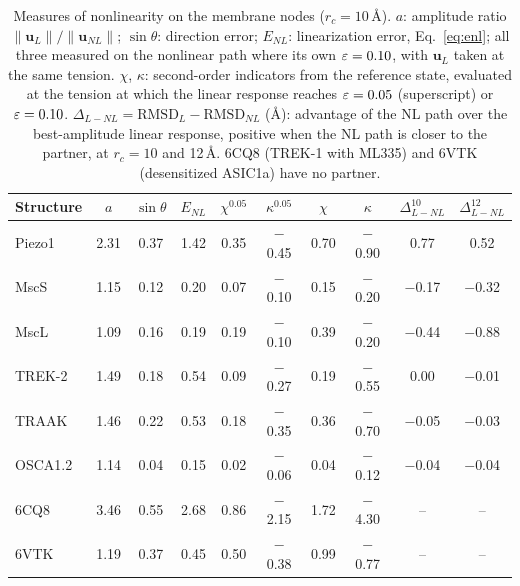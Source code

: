 \begin{table}[t]
\centering\small
\caption{Measures of nonlinearity on the membrane nodes ($r_c=10$\,\AA). $a$: amplitude ratio $\|\mathbf{u}_L\|/\|\mathbf{u}_{NL}\|$; $\sin\theta$: direction error; $E_{NL}$: linearization error, Eq.~\eqref{eq:enl}; all three measured on the nonlinear path where its own $\varepsilon=0.10$, with $\mathbf{u}_L$ taken at the same tension. $\chi$, $\kappa$: second-order indicators from the reference state, evaluated at the tension at which the linear response reaches $\varepsilon=0.05$ (superscript) or $\varepsilon=0.10$. $\Delta_{L-NL}=\mathrm{RMSD}_{L}-\mathrm{RMSD}_{NL}$ (\AA): advantage of the NL path over the best-amplitude linear response, positive when the NL path is closer to the partner, at $r_c=10$ and 12\,\AA. 6CQ8 (TREK-1 with ML335) and 6VTK (desensitized ASIC1a) have no partner.}
\label{tab:nl}
\setlength{\tabcolsep}{4pt}
\begin{tabular}{lccccccccc}
\toprule
Structure & $a$ & $\sin\theta$ & $E_{NL}$ & $\chi^{0.05}$ & $\kappa^{0.05}$ & $\chi$ & $\kappa$ & $\Delta_{L-NL}^{10}$ & $\Delta_{L-NL}^{12}$\\
\midrule
Piezo1 & 2.31 & 0.37 & 1.42 & 0.35 & $-$0.45 & 0.70 & $-$0.90 & 0.77 & 0.52\\
MscS & 1.15 & 0.12 & 0.20 & 0.07 & $-$0.10 & 0.15 & $-$0.20 & $-$0.17 & $-$0.32\\
MscL & 1.09 & 0.16 & 0.19 & 0.19 & $-$0.10 & 0.39 & $-$0.20 & $-$0.44 & $-$0.88\\
TREK-2 & 1.49 & 0.18 & 0.54 & 0.09 & $-$0.27 & 0.19 & $-$0.55 & 0.00 & $-$0.01\\
TRAAK & 1.46 & 0.22 & 0.53 & 0.18 & $-$0.35 & 0.36 & $-$0.70 & $-$0.05 & $-$0.03\\
OSCA1.2 & 1.14 & 0.04 & 0.15 & 0.02 & $-$0.06 & 0.04 & $-$0.12 & $-$0.04 & $-$0.04\\
6CQ8 & 3.46 & 0.55 & 2.68 & 0.86 & $-$2.15 & 1.72 & $-$4.30 & -- & --\\
6VTK & 1.19 & 0.37 & 0.45 & 0.50 & $-$0.38 & 0.99 & $-$0.77 & -- & --\\
\bottomrule
\end{tabular}
\end{table}
